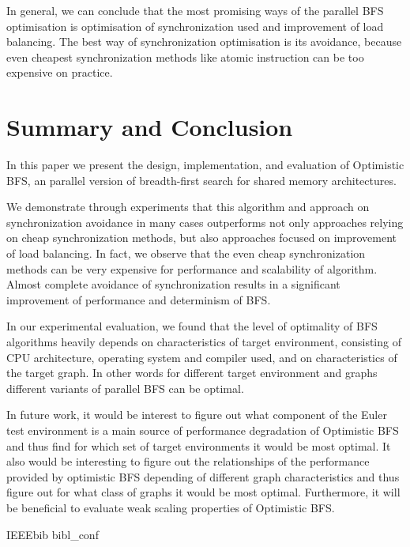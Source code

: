 \documentclass[letterpaper]{article}
\begin{document}
		In general, we can conclude that the most promising ways of the parallel BFS optimisation is optimisation of synchronization used and improvement of load balancing. 
		The best way of synchronization optimisation is its avoidance, because even cheapest synchronization methods like atomic instruction can be too expensive on practice.
		
	\section{Summary and Conclusion}\label{sec:suco} %
		In this paper we present the design, implementation, and evaluation of Optimistic BFS, an parallel version of breadth-first search for shared memory architectures.
		
		We demonstrate through experiments that this algorithm and approach on synchronization avoidance in many cases outperforms not only approaches relying on cheap synchronization methods, but also approaches focused on improvement of load balancing. 		
		In fact, we observe that the even cheap synchronization methods can be very expensive for performance and scalability of algorithm.  
		Almost complete avoidance of synchronization results in a significant improvement of performance and determinism of BFS. 
		
		In our experimental evaluation, we found that the level of optimality of BFS algorithms  heavily depends on characteristics of target environment, consisting of CPU architecture, operating system and compiler used, and on characteristics of the target graph. 
		In other words for different target environment and graphs different variants of parallel BFS can be optimal. 
		
		In future work, it would be interest to figure out what component of the Euler test environment is a main source of performance degradation of Optimistic BFS and thus find for which set of target environments it would be most optimal.  		
		It also would be interesting to figure out the relationships of the performance provided by optimistic BFS depending of different graph characteristics and thus figure out for what class of graphs it would be most optimal.
		Furthermore, it will be beneficial to evaluate weak scaling properties of Optimistic BFS.
	
	 	{IEEEbib} %
	 		{bibl_conf}
\end{document}
